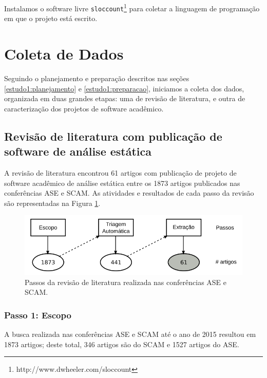 Instalamos o software livre
\texttt{sloccount}\footnote{http://www.dwheeler.com/sloccount} para coletar a
linguagem de programação em que o projeto está escrito.


\section{Coleta de Dados} \label{estudo1:coleta} %

Seguindo o planejamento e preparação descritos nas seções
\ref{estudo1:planejamento} e \ref{estudo1:preparacao}, iniciamos a coleta dos
dados, organizada em duas grandes etapas: uma de revisão de literatura, e outra
de caracterização dos projetos de software acadêmico.

\subsection{Revisão de literatura com publicação de software de análise estática}

A revisão de literatura encontrou 61 artigos com publicação de projeto de
software acadêmico de análise estática entre os 1873 artigos publicados nas
conferências ASE e SCAM. As atividades e resultados de cada passo da revisão
são representadas na Figura \ref{revisao-literatura}.

\begin{figure}[h]
  \center
  \includegraphics[scale=0.4]{imagens/revisao-literatura.png}
  \caption{Passos da revisão de literatura realizada nas conferências ASE e SCAM.}
  \label{revisao-literatura}
\end{figure}

\subsubsection{Passo 1: Escopo}

A busca realizada nas conferências ASE e SCAM até o ano de 2015 resultou em
1873 artigos; deste total, 346 artigos são do SCAM e 1527 artigos do ASE.

